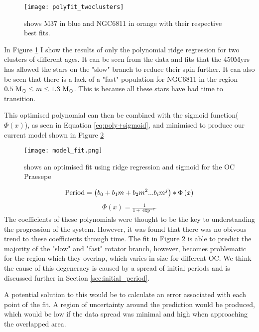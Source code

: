 \documentclass[fleqn,usenatbib]{mnras}
\begin{document}
\begin{figure}
	\texttt{[image: polyfit\_twoclusters]}
	\caption{shows M37 in blue and NGC6811 in orange with their respective best fits.}
	\label{fig:polyfit_twoclusters}
\end{figure}

In Figure \ref{fig:polyfit_twoclusters} I show the results of only the polynomial ridge regression for two clusters of different ages.
It can be seen from the data and fits that the 450Myrs has allowed the stars on the "slow" branch to reduce their spin further.
It can also be seen that there is a lack of a "fast" population for NGC6811 in the region $0.5~\textup{M}_\odot \leq m \leq 1.3~\textup{M}_\odot$.
This is because all these stars have had time to transition.

This optimised polynomial can then be combined with the sigmoid function($\Phi\left(x\right)$), as seen in Equation \ref{eq:poly+sigmoid}, and minimised to produce our current model shown in Figure \ref{fig:model_fit}
\begin{figure}
	\texttt{[image: model\_fit.png]}
	\caption{shows an optimised fit using ridge regression and sigmoid for the OC Praesepe}
	\label{fig:model_fit}
\end{figure}
\begin{align}
	\label{eq:poly+sigmoid}
	\textup{Period} = \left(b_0 + b_1m + b_2m^2...b_im^j\right)*\Phi\left(x\right) 
\end{align}
\begin{align}
	\label{eq:sigmoid}
	\Phi\left(x\right) = \frac{1}{1 + \exp^{-x}}
\end{align}
The coefficients of these polynomials were thought to be the key to understanding the progression of the system.
However, it was found that there was no obivous trend to these coefficients through time.
The fit in Figure \ref{fig:model_fit} is able to predict the majority of the "slow" and "fast" rotator branch, however, becomes problematic for the region which they overlap, which varies in size for different OC.
We think the cause of this degeneracy is caused by a spread of initial periods and is discussed further in Section \ref{sec:initial_period}.

A potential solution to this would be to calculate an error associated with each point of the fit.
A region of uncertainty around the prediction would be produced, which would be low if the data spread was minimal and high when approaching the overlapped area.
\end{document}
